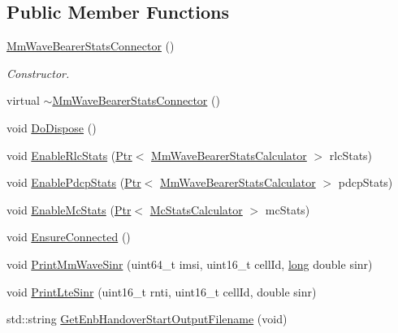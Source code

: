 \subsection*{Public Member Functions}
\begin{DoxyCompactItemize}
\item 
\hyperlink{classns3_1_1MmWaveBearerStatsConnector_a1841c39462c1210833c66479ecbda56f}{Mm\+Wave\+Bearer\+Stats\+Connector} ()
\begin{DoxyCompactList}\small\item\em Constructor. \end{DoxyCompactList}\item 
virtual \hyperlink{classns3_1_1MmWaveBearerStatsConnector_ad77510402c9b77890c306f64a0b02aba}{$\sim$\+Mm\+Wave\+Bearer\+Stats\+Connector} ()
\item 
void \hyperlink{classns3_1_1MmWaveBearerStatsConnector_a3ff17c0ce8edec1e2ca91a40cfbbc512}{Do\+Dispose} ()
\item 
void \hyperlink{classns3_1_1MmWaveBearerStatsConnector_a2f5728fc0218f779fe5802e931fb97f3}{Enable\+Rlc\+Stats} (\hyperlink{classns3_1_1Ptr}{Ptr}$<$ \hyperlink{classns3_1_1MmWaveBearerStatsCalculator}{Mm\+Wave\+Bearer\+Stats\+Calculator} $>$ rlc\+Stats)
\item 
void \hyperlink{classns3_1_1MmWaveBearerStatsConnector_a3ec51213db090a61e74609a2bc2653f1}{Enable\+Pdcp\+Stats} (\hyperlink{classns3_1_1Ptr}{Ptr}$<$ \hyperlink{classns3_1_1MmWaveBearerStatsCalculator}{Mm\+Wave\+Bearer\+Stats\+Calculator} $>$ pdcp\+Stats)
\item 
void \hyperlink{classns3_1_1MmWaveBearerStatsConnector_a2b556a8fbded9ce4a117a5757c124b18}{Enable\+Mc\+Stats} (\hyperlink{classns3_1_1Ptr}{Ptr}$<$ \hyperlink{classns3_1_1McStatsCalculator}{Mc\+Stats\+Calculator} $>$ mc\+Stats)
\item 
void \hyperlink{classns3_1_1MmWaveBearerStatsConnector_ad020f15189eea1cb6a84555c452d21fd}{Ensure\+Connected} ()
\item 
void \hyperlink{classns3_1_1MmWaveBearerStatsConnector_a96267aa2e0e447dde6567cecc394779d}{Print\+Mm\+Wave\+Sinr} (uint64\+\_\+t imsi, uint16\+\_\+t cell\+Id, \hyperlink{generate__test__data__lte__sinr_8m_a0eab6be67e93c3411f7a8b53cc297285}{long} double sinr)
\item 
void \hyperlink{classns3_1_1MmWaveBearerStatsConnector_a648644c071e115ce4950a9c735d2adcb}{Print\+Lte\+Sinr} (uint16\+\_\+t rnti, uint16\+\_\+t cell\+Id, double sinr)
\item 
std\+::string \hyperlink{classns3_1_1MmWaveBearerStatsConnector_ae3706e28d55b3b29b1c299659271ce51}{Get\+Enb\+Handover\+Start\+Output\+Filename} (void)

\end{DoxyCompactItemize}
